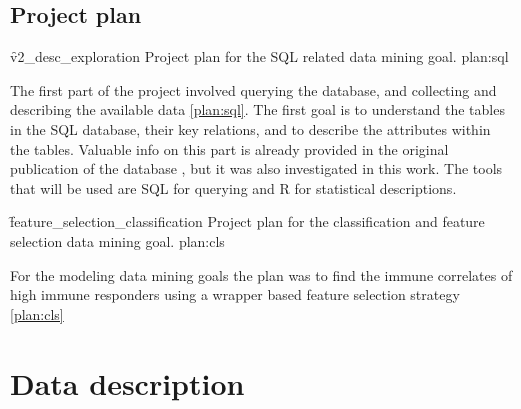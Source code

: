 \subsection{Project plan}

\f{v2_desc_exploration}
{Project plan for the SQL related data mining goal.}
{plan:sql}

The first part of the project involved querying the database, and collecting
and describing the available data \autoref{plan:sql}. The first goal is to
understand the tables in the SQL database, their key relations, and to describe
the attributes within the tables. Valuable info on this part is already
provided in the original publication of the database
\cite{tomicFluPRINTDatasetMultidimensional2019}, but it was also investigated
in this work. The tools that will be used are SQL for querying and R for
statistical descriptions.


%

\f{feature_selection_classification}
{Project plan for the classification and feature selection data mining goal.}
{plan:cls}

For the modeling data mining goals the plan was to find the immune correlates
of high immune responders using a wrapper based feature selection strategy
\autoref{plan:cls}


\section{Data description}

